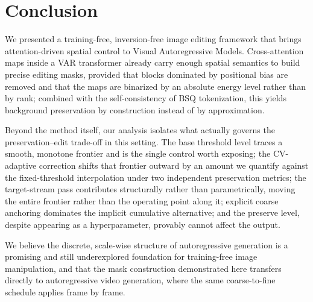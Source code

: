 \section{Conclusion}
\label{section:conclusion}

We presented a training-free, inversion-free image editing framework that brings
attention-driven spatial control to Visual Autoregressive Models. Cross-attention
maps inside a VAR transformer already carry enough spatial semantics to build
precise editing masks, provided that blocks dominated by positional bias are
removed and that the maps are binarized by an absolute energy level rather than
by rank; combined with the self-consistency of BSQ tokenization, this yields
background preservation by construction instead of by approximation.

Beyond the method itself, our analysis isolates what actually governs the
preservation--edit trade-off in this setting. The base threshold level traces a
smooth, monotone frontier and is the single control worth exposing; the
CV-adaptive correction shifts that frontier outward by an amount we quantify
against the fixed-threshold interpolation under two independent preservation
metrics; the target-stream pass contributes structurally rather than
parametrically, moving the entire frontier rather than the operating point along
it; explicit coarse anchoring dominates the implicit cumulative alternative; and
the preserve level, despite appearing as a hyperparameter, provably cannot affect
the output.

We believe the discrete, scale-wise structure of autoregressive generation is a
promising and still underexplored foundation for training-free image
manipulation, and that the mask construction demonstrated here transfers directly
to autoregressive video generation, where the same coarse-to-fine schedule
applies frame by frame.


